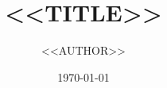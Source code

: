 \documentclass[aps,prl,onecolumn,notitlepage,superscriptaddress]{revtex4-2}
\begin{document}
\title{<<TITLE>>}
\author{<<AUTHOR>>}
\date{\today}
\maketitle
\setcounter{secnumdepth}{3}

\tableofcontents


\printnotation

% 
\end{document}
